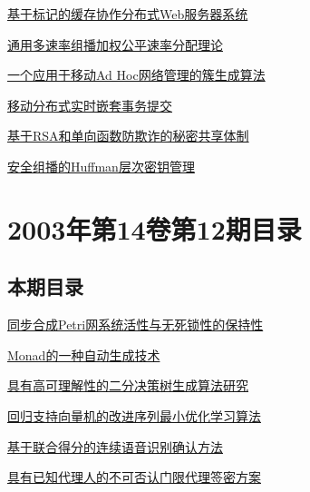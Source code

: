 \documentclass[a4paper]{article}
\begin{document}
\href{http://www.jos.org.cn/ch/reader/download_pdf.aspx?file_no=20030118&year_id=2003&quarter_id=1&falg=1}{基于标记的缓存协作分布式Web服务器系统}

\href{http://www.jos.org.cn/ch/reader/download_pdf.aspx?file_no=20030119&year_id=2003&quarter_id=1&falg=1}{通用多速率组播加权公平速率分配理论}

\href{http://www.jos.org.cn/ch/reader/download_pdf.aspx?file_no=20030120&year_id=2003&quarter_id=1&falg=1}{一个应用于移动Ad Hoc网络管理的簇生成算法}

\href{http://www.jos.org.cn/ch/reader/download_pdf.aspx?file_no=20030121&year_id=2003&quarter_id=1&falg=1}{移动分布式实时嵌套事务提交}

\href{http://www.jos.org.cn/ch/reader/download_pdf.aspx?file_no=20030122&year_id=2003&quarter_id=1&falg=1}{基于RSA和单向函数防欺诈的秘密共享体制}

\href{http://www.jos.org.cn/ch/reader/download_pdf.aspx?file_no=20030123&year_id=2003&quarter_id=1&falg=1}{安全组播的Huffman层次密钥管理}


\section{\textbf{2003年第14卷第12期目录}}
\subsection{本期目录}
\href{http://www.jos.org.cn/ch/reader/download_pdf.aspx?file_no=20031201&year_id=2003&quarter_id=12&falg=1}{同步合成Petri网系统活性与无死锁性的保持性}

\href{http://www.jos.org.cn/ch/reader/download_pdf.aspx?file_no=20031202&year_id=2003&quarter_id=12&falg=1}{Monad的一种自动生成技术}

\href{http://www.jos.org.cn/ch/reader/download_pdf.aspx?file_no=20031203&year_id=2003&quarter_id=12&falg=1}{具有高可理解性的二分决策树生成算法研究}

\href{http://www.jos.org.cn/ch/reader/download_pdf.aspx?file_no=20031204&year_id=2003&quarter_id=12&falg=1}{回归支持向量机的改进序列最小优化学习算法}

\href{http://www.jos.org.cn/ch/reader/download_pdf.aspx?file_no=20031205&year_id=2003&quarter_id=12&falg=1}{基于联合得分的连续语音识别确认方法}

\href{http://www.jos.org.cn/ch/reader/download_pdf.aspx?file_no=20031206&year_id=2003&quarter_id=12&falg=1}{具有已知代理人的不可否认门限代理签密方案}
\end{document}
